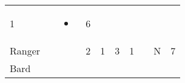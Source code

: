 \documentclass[12pt]{article}
\begin{document}
\begin{longtable}[]{@{}llllllllll@{}}
\begin{minipage}[t]{0.06\columnwidth}
1
\strut\end{minipage} &
\begin{minipage}[t]{0.06\columnwidth}\raggedright\strut
\strut\end{minipage} &
\begin{minipage}[t]{0.07\columnwidth}\raggedright\strut
\begin{itemize}
\item
\end{itemize}
\strut\end{minipage} &
\begin{minipage}[t]{0.08\columnwidth}\raggedright\strut
6
\strut\end{minipage}\tabularnewline
\begin{minipage}[t]{0.13\columnwidth}\raggedright\strut
Ranger
\strut\end{minipage} &
\begin{minipage}[t]{0.06\columnwidth}\raggedright\strut
\strut\end{minipage} &
\begin{minipage}[t]{0.06\columnwidth}\raggedright\strut
\strut\end{minipage} &
\begin{minipage}[t]{0.06\columnwidth}\raggedright\strut
2
\strut\end{minipage} &
\begin{minipage}[t]{0.06\columnwidth}\raggedright\strut
1
\strut\end{minipage} &
\begin{minipage}[t]{0.06\columnwidth}\raggedright\strut
3
\strut\end{minipage} &
\begin{minipage}[t]{0.06\columnwidth}\raggedright\strut
1
\strut\end{minipage} &
\begin{minipage}[t]{0.06\columnwidth}\raggedright\strut
\strut\end{minipage} &
\begin{minipage}[t]{0.07\columnwidth}\raggedright\strut
N
\strut\end{minipage} &
\begin{minipage}[t]{0.08\columnwidth}\raggedright\strut
7
\strut\end{minipage}\tabularnewline
\begin{minipage}[t]{0.13\columnwidth}\raggedright\strut
Bard
\strut\end{minipage} &
\begin{minipage}[t]{0.06\columnwidth}\raggedright\strut
\strut\end{minipage} &

\end{longtable}
\end{document}
